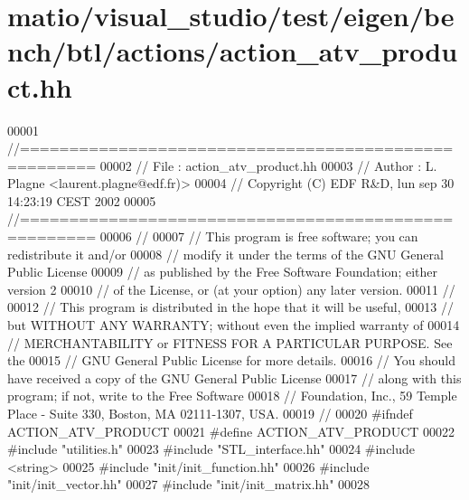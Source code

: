 \hypertarget{matio_2visual__studio_2test_2eigen_2bench_2btl_2actions_2action__atv__product_8hh_source}{}\section{matio/visual\+\_\+studio/test/eigen/bench/btl/actions/action\+\_\+atv\+\_\+product.hh}
\label{matio_2visual__studio_2test_2eigen_2bench_2btl_2actions_2action__atv__product_8hh_source}

\begin{DoxyCode}
00001 \textcolor{comment}{//=====================================================}
00002 \textcolor{comment}{// File   :  action\_atv\_product.hh}
00003 \textcolor{comment}{// Author :  L. Plagne <laurent.plagne@edf.fr)>}
00004 \textcolor{comment}{// Copyright (C) EDF R&D,  lun sep 30 14:23:19 CEST 2002}
00005 \textcolor{comment}{//=====================================================}
00006 \textcolor{comment}{//}
00007 \textcolor{comment}{// This program is free software; you can redistribute it and/or}
00008 \textcolor{comment}{// modify it under the terms of the GNU General Public License}
00009 \textcolor{comment}{// as published by the Free Software Foundation; either version 2}
00010 \textcolor{comment}{// of the License, or (at your option) any later version.}
00011 \textcolor{comment}{//}
00012 \textcolor{comment}{// This program is distributed in the hope that it will be useful,}
00013 \textcolor{comment}{// but WITHOUT ANY WARRANTY; without even the implied warranty of}
00014 \textcolor{comment}{// MERCHANTABILITY or FITNESS FOR A PARTICULAR PURPOSE.  See the}
00015 \textcolor{comment}{// GNU General Public License for more details.}
00016 \textcolor{comment}{// You should have received a copy of the GNU General Public License}
00017 \textcolor{comment}{// along with this program; if not, write to the Free Software}
00018 \textcolor{comment}{// Foundation, Inc., 59 Temple Place - Suite 330, Boston, MA  02111-1307, USA.}
00019 \textcolor{comment}{//}
00020 \textcolor{preprocessor}{#ifndef ACTION\_ATV\_PRODUCT}
00021 \textcolor{preprocessor}{#define ACTION\_ATV\_PRODUCT}
00022 \textcolor{preprocessor}{#include "utilities.h"}
00023 \textcolor{preprocessor}{#include "STL\_interface.hh"}
00024 \textcolor{preprocessor}{#include <string>}
00025 \textcolor{preprocessor}{#include "init/init\_function.hh"}
00026 \textcolor{preprocessor}{#include "init/init\_vector.hh"}
00027 \textcolor{preprocessor}{#include "init/init\_matrix.hh"}
00028 

\end{DoxyCode}
